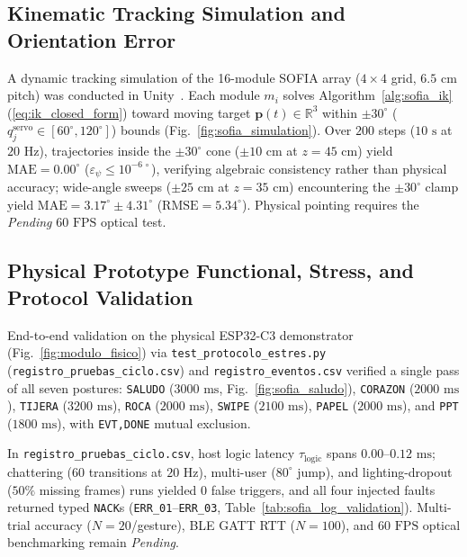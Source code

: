 \documentclass[lettersize,journal]{IEEEtran}
\begin{document}
	\subsection{Kinematic Tracking Simulation and Orientation Error}
	\label{sec:results_simulation}
	A dynamic tracking simulation of the 16-module SOFIA array ($4 \times 4$ grid, $6.5\text{ cm}$ pitch) was conducted in Unity~\cite{unity2023engine}. Each module $m_i$ solves Algorithm~\ref{alg:sofia_ik} (\eqref{eq:ik_closed_form}) toward moving target $\mathbf{p}(t) \in \mathbb{R}^3$ within $\pm 30^\circ$ ($q_j^{\text{servo}} \in [60^\circ, 120^\circ]$) bounds (Fig.~\ref{fig:sofia_simulation}). Over $200$ steps ($10\text{ s}$ at $20\text{ Hz}$), trajectories inside the $\pm 30^\circ$ cone ($\pm 10\text{ cm}$ at $z = 45\text{ cm}$) yield $\text{MAE} = 0.00^\circ$ ($\varepsilon_\psi \le 10^{-6\,\circ}$), verifying algebraic consistency rather than physical accuracy; wide-angle sweeps ($\pm 25\text{ cm}$ at $z = 35\text{ cm}$) encountering the $\pm 30^\circ$ clamp yield $\text{MAE} = 3.17^\circ \pm 4.31^\circ$ ($\text{RMSE} = 5.34^\circ$). Physical pointing requires the \textit{Pending} $60\text{ FPS}$ optical test.
	
	\subsection{Physical Prototype Functional, Stress, and Protocol Validation}
	\label{sec:physical_validation}
	\label{sec:functional_performance}
	
	End-to-end validation on the physical ESP32-C3 demonstrator (Fig.~\ref{fig:modulo_fisico}) via \texttt{test\_protocolo\_estres.py} (\texttt{registro\_pruebas\_ciclo.csv}) and \texttt{registro\_eventos.csv} verified a single pass of all seven postures: \texttt{SALUDO} ($3000\text{ ms}$, Fig.~\ref{fig:sofia_saludo}), \texttt{CORAZON} ($2000\text{ ms}$), \texttt{TIJERA} ($3200\text{ ms}$), \texttt{ROCA} ($2000\text{ ms}$), \texttt{SWIPE} ($2100\text{ ms}$), \texttt{PAPEL} ($2000\text{ ms}$), and \texttt{PPT} ($1800\text{ ms}$), with \texttt{EVT,DONE} mutual exclusion.
	
	In \texttt{registro\_pruebas\_ciclo.csv}, host logic latency $\tau_{\text{logic}}$ spans $0.00\text{--}0.12\text{ ms}$; chattering ($60$ transitions at $20\text{ Hz}$), multi-user ($80^\circ$ jump), and lighting-dropout ($50\%$ missing frames) runs yielded $0$ false triggers, and all four injected faults returned typed \texttt{NACK}s (\texttt{ERR\_01}--\texttt{ERR\_03}, Table~\ref{tab:sofia_log_validation}). Multi-trial accuracy ($N=20$/gesture), BLE GATT RTT ($N=100$), and $60\text{ FPS}$ optical benchmarking remain \textit{Pending}.
	
\end{document}
